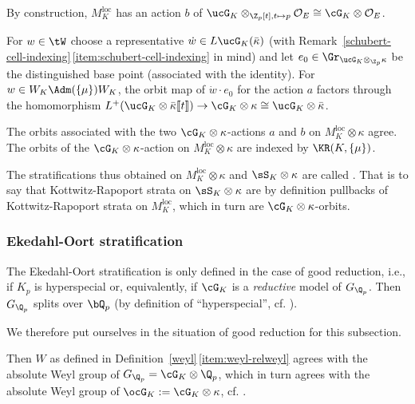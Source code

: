 \documentclass[a4paper]{scrartcl} %
\numberwithin{equation}{section}
\begin{document}
\begin{Remark}
  By construction, $M^\mathrm{loc}_K$ has an action $b$ of $\ucG_K\otimes_{\Z_p[t],t\mapsto p}\mathcal{O}_E\cong \cG_K\otimes\mathcal{O}_E$.

  For $w\in\tW$ choose a representative $\dot{w}\in L\ucG_K(\bar\kappa)$ (with Remark~\ref{schubert-cell-indexing}\,\eqref{item:schubert-cell-indexing} in mind) and let $e_0\in\Gr_{\ucG_K\otimes_{\Z_p}\kappa}$ be the distinguished base point (associated with the identity). For $w \in W_K\Adm(\{\mu\})W_K$, the orbit map of $\dot{w}\cdot e_0$ for the action $a$ factors through the homomorphism $L^+(\ucG_K\otimes\bar\kappa\llbracket t\rrbracket) \to \cG_K\otimes\kappa \cong \ucG_K\otimes\bar\kappa$.

  The orbits associated with the two $\cG_K\otimes\kappa$-actions $a$ and $b$ on
  $M^\mathrm{loc}_K\otimes\kappa$
  agree. The orbits of the $\cG_K\otimes\kappa$-action on $M^\mathrm{loc}_K\otimes\kappa$ are indexed by $\KR(K,\{\mu\})$.
\end{Remark}

\begin{Definition}
  The stratifications thus obtained on $M^\mathrm{loc}_K\otimes\kappa$ and $\sS_K\otimes\kappa$ are called . That is to say that  Kottwitz-Rapoport strata on $\sS_K\otimes\kappa$ are by definition pullbacks of Kottwitz-Rapoport strata on $M^\mathrm{loc}_K$, which in turn are $\cG_K\otimes\kappa$-orbits.
\end{Definition}



\subsubsection{Ekedahl-Oort stratification}
\label{sec:eked-oort-strat}

The Ekedahl-Oort stratification is only defined in the case of good reduction, i.e., if $K_p$ is hyperspecial or, equivalently, if $\cG_K$ is a \emph{reductive} model of $G_{\Q_p}$. Then $G_{\Q_p}$ splits over $\bQ_p$ (by definition of ``hyperspecial'', cf. \cite[.2]{tits}).

We therefore put ourselves in the situation of good reduction for this subsection.

\begin{Remark}
  Then $W$ as defined in Definition~\ref{weyl}\,\eqref{item:weyl-relweyl} agrees with the absolute Weyl group of $G_{\Q_p}=\cG_K\otimes\Q_p$, which in turn agrees with the absolute Weyl group of $\ocG_K:=\cG_K\otimes\kappa$, cf. \cite[App.~A.5]{vieh-wed}.
\end{Remark}
\end{document}
